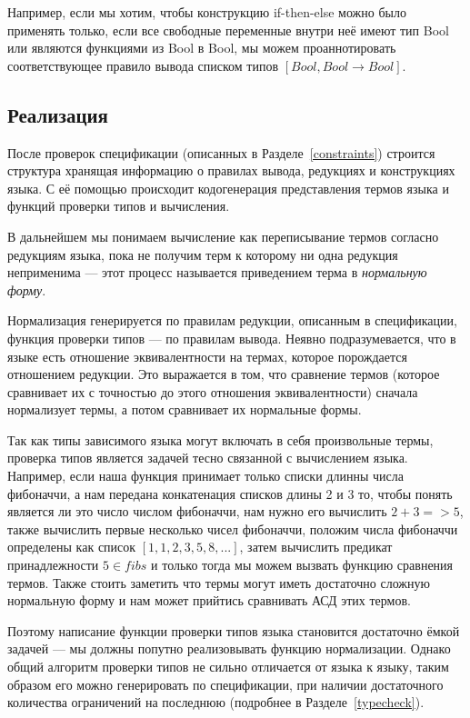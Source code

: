 Например, если мы хотим, чтобы конструкцию if-then-else можно было применять только, если все свободные переменные внутри неё имеют тип Bool или являются функциями из Bool в Bool, мы можем проаннотировать соответствующее правило вывода списком типов $[Bool, Bool\rightarrow Bool]$.

\subsection*{Реализация}

После проверок спецификации (описанных в Разделе~\ref{constraints}) строится структура хранящая информацию о правилах вывода, редукциях и конструкциях языка. С её помощью происходит кодогенерация представления термов языка и функций проверки типов и вычисления.

В дальнейшем мы понимаем вычисление как переписывание термов согласно редукциям языка, пока не получим терм к которому ни одна редукция неприменима --- этот процесс называется приведением терма в \textit{нормальную форму}.

Нормализация генерируется по правилам редукции, описанным в спецификации, функция проверки типов --- по правилам вывода. Неявно подразумевается, что в языке есть отношение эквивалентности на термах, которое порождается отношением редукции. Это выражается в том, что сравнение термов (которое сравнивает их с точностью до этого отношения эквивалентности) сначала нормализует термы, а потом сравнивает их нормальные формы.

Так как типы зависимого языка могут включать в себя произвольные термы, проверка типов является задачей тесно связанной с вычислением языка. Например, если наша функция принимает только списки длинны числа фибоначчи, а нам передана конкатенация списков длины 2 и 3 то, чтобы понять является ли это число числом фибоначчи, нам нужно его вычислить $2 + 3 => 5$, также вычислить первые несколько чисел фибоначчи, положим числа фибоначчи определены как список $[1,1,2,3,5,8,...]$, затем вычислить предикат принадлежности $5 \in fibs$ и только тогда мы можем вызвать функцию сравнения термов. Также стоить заметить что термы могут иметь достаточно сложную нормальную форму и нам может прийтись сравнивать АСД этих термов.

Поэтому написание функции проверки типов языка становится достаточно ёмкой задачей --- мы должны попутно реализовывать функцию нормализации. Однако общий алгоритм проверки типов не сильно отличается от языка к языку, таким образом его можно генерировать по спецификации, при наличии достаточного количества ограничений на последнюю (подробнее в Разделе~\ref{typecheck}).


